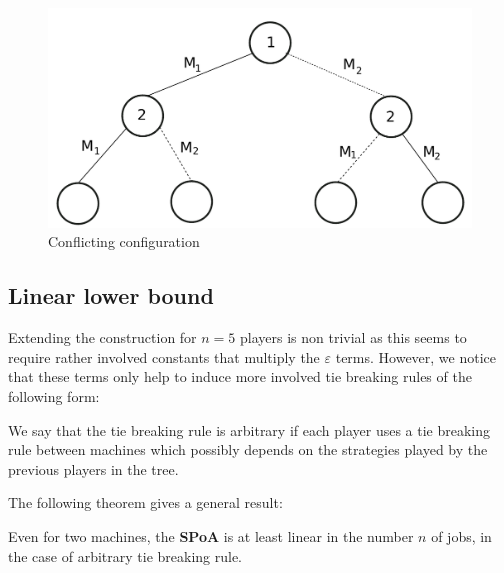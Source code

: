 \documentclass[runningheads]{llncs}
\newcommand{\pp}[1]{\todo[color=blue!40!white]{\scriptsize Pao: #1}}
\newtheorem{assumption}[lemma]{Assumption}
\renewcommand{\epsilon}{\varepsilon}
\newcommand{\SPoA}{\textbf{SPoA}\xspace}
\begin{document}
\begin{figure}
	\centering
	\includegraphics[scale=.3]{structural}
	\caption{Conflicting configuration}
	\label{fig:conflicting}
\end{figure}


\subsection{Linear lower bound}
Extending  the construction for $n=5$ players is non trivial as this seems to require rather involved constants that multiply the $\epsilon$ terms. However, we notice that these terms only help to induce more involved tie breaking rules of the following form:


\begin{definition}
	We say that the tie breaking rule is arbitrary if each player uses a tie breaking rule between machines which possibly depends on the strategies played by the previous players in the tree.
\end{definition}


The following theorem gives a general result:

\begin{theorem}
\label{counterexample}
Even for two machines, the \SPoA is at least linear in the number $n$ of jobs, in the case of arbitrary tie breaking rule.
\end{theorem}
\end{document}
